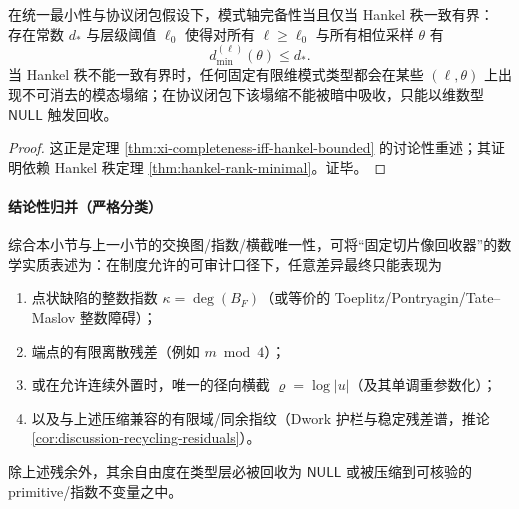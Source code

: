 \begin{theorem}\label{thm:discussion-dimensional-null-trigger}
在统一最小性与协议闭包假设下，模式轴完备性当且仅当 Hankel 秩一致有界：
存在常数 \(d_\ast\) 与层级阈值 \(\ell_0\) 使得对所有 \(\ell\ge \ell_0\) 与所有相位采样 \(\theta\) 有
\[
d^{(\ell)}_{\min}(\theta)\le d_\ast.
\]
当 Hankel 秩不能一致有界时，任何固定有限维模式类型都会在某些 \((\ell,\theta)\) 上出现不可消去的模态塌缩；在协议闭包下该塌缩不能被暗中吸收，只能以维数型 \(\mathsf{NULL}\) 触发回收。
\end{theorem}

\begin{proof}
这正是定理 \ref{thm:xi-completeness-iff-hankel-bounded} 的讨论性重述；其证明依赖 Hankel 秩定理 \ref{thm:hankel-rank-minimal}。证毕。
\end{proof}

\paragraph{结论性归并（严格分类）}
综合本小节与上一小节的交换图/指数/横截唯一性，可将“固定切片像回收器”的数学实质表述为：在制度允许的可审计口径下，任意差异最终只能表现为
\begin{enumerate}
  \item 点状缺陷的整数指数 \(\kappa=\deg(B_F)\)（或等价的 Toeplitz/Pontryagin/Tate--Maslov 整数障碍）；
  \item 端点的有限离散残差（例如 \(m\bmod 4\)）；
  \item 或在允许连续外置时，唯一的径向横截 \(\varrho=\log|u|\)（及其单调重参数化）；
  \item 以及与上述压缩兼容的有限域/同余指纹（Dwork 护栏与稳定残差谱，推论 \ref{cor:discussion-recycling-residuals}）。
\end{enumerate}
除上述残余外，其余自由度在类型层必被回收为 \(\mathsf{NULL}\) 或被压缩到可核验的 primitive/指数不变量之中。

\endinput
